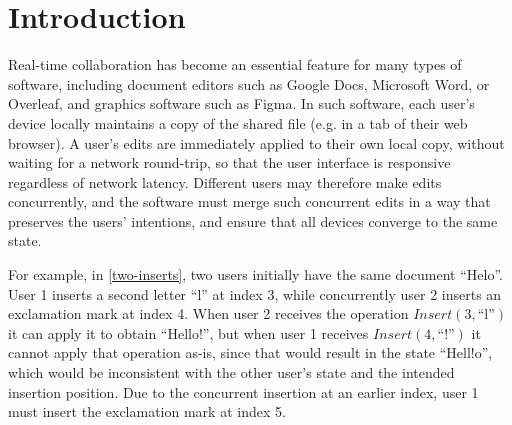 \documentclass[sigplan,10pt]{acmart}
\begin{document}

\maketitle

\section{Introduction}\label{introduction}

Real-time collaboration has become an essential feature for many types of software, including document editors such as Google Docs, Microsoft Word, or Overleaf, and graphics software such as Figma.
In such software, each user's device locally maintains a copy of the shared file (e.g. in a tab of their web browser).
A user's edits are immediately applied to their own local copy, without waiting for a network round-trip, so that the user interface is responsive regardless of network latency.
Different users may therefore make edits concurrently, and the software must merge such concurrent edits in a way that preserves the users' intentions, and ensure that all devices converge to the same state.

For example, in \autoref{two-inserts}, two users initially have the same document ``Helo''.
User 1 inserts a second letter ``l'' at index 3, while concurrently user 2 inserts an exclamation mark at index 4.
When user 2 receives the operation $\mathit{Insert}(3, \text{``l''})$ it can apply it to obtain ``Hello!'', but when user 1 receives $\mathit{Insert}(4, \text{``!''})$ it cannot apply that operation as-is, since that would result in the state ``Hell!o'', which would be inconsistent with the other user's state and the intended insertion position.
Due to the concurrent insertion at an earlier index, user 1 must insert the exclamation mark at index 5.
\end{document}
